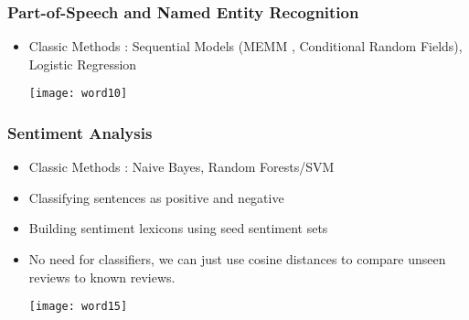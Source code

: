 \begin{frame}[fragile]\frametitle{Part-of-Speech and Named Entity Recognition}


\begin{itemize}
\item Classic Methods :  Sequential Models (MEMM , Conditional Random Fields),  Logistic Regression
\begin{center}
\texttt{[image: word10]}
\end{center}
\end{itemize}
\end{frame}
%
%

\begin{frame}[fragile]\frametitle{Sentiment Analysis}

\begin{itemize}
\item Classic Methods : Naive Bayes, Random Forests/SVM
\item Classifying sentences as positive and negative
\item Building sentiment lexicons using seed sentiment sets
\item No need for classifiers, we can just use cosine distances to compare unseen reviews to known reviews.

\begin{center}
\texttt{[image: word15]}
\end{center}
\end{itemize}
\end{frame}

